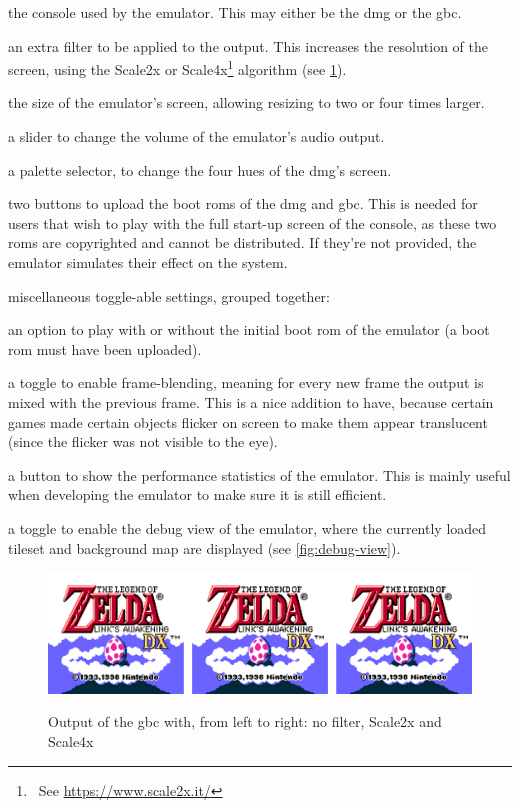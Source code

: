 \documentclass[11pt]{informatics-report}
\newcommand{\ftnt}[1]{\footnote{~See \url{#1}}}
\begin{document}
\begin{compactitem}
	\item the console used by the emulator. This may either be the \gls{dmg} or the \gls{gbc}.
	\item an extra filter to be applied to the output. This increases the resolution of the screen, using the Scale2x or Scale4x\ftnt{https://www.scale2x.it/} algorithm (see \ref{fig:scale-filter}).
	\item the size of the emulator's screen, allowing resizing to two or four times larger.
	\item a slider to change the volume of the emulator's audio output.
	\item a palette selector, to change the four hues of the \gls{dmg}'s screen.
	\item two buttons to upload the boot \glspl{rom} of the \gls{dmg} and \gls{gbc}. This is needed for users that wish to play with the full start-up screen of the console, as these two \glspl{rom} are copyrighted and cannot be distributed. If they're not provided, the emulator simulates their effect on the system.
	\item miscellaneous toggle-able settings, grouped together:
	\begin{compactitem}
		\item an option to play with or without the initial boot \gls{rom} of the emulator (a boot \gls{rom} must have been uploaded).
		\item a toggle to enable frame-blending, meaning for every new frame the output is mixed with the previous frame. This is a nice addition to have, because certain games made certain objects flicker on screen to make them appear translucent (since the flicker was not visible to the eye).
		\item a button to show the performance statistics of the emulator. This is mainly useful when developing the emulator to make sure it is still efficient.
		\item a toggle to enable the debug view of the emulator, where the currently loaded tileset and background map are displayed (see \ref{fig:debug-view}).
	\end{compactitem}
\end{compactitem}

\begin{figure}[h]
    \centering
    \includegraphics[width=15cm]{images/scale-filter}\\
    \caption{Output of the \gls{gbc} with, from left to right: no filter, Scale2x and Scale4x}
    \label{fig:scale-filter}
\end{figure}
\end{document}
